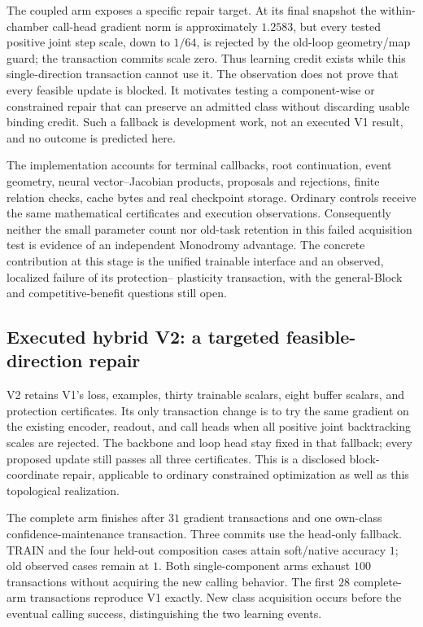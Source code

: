 The coupled arm exposes a specific repair target. At its final snapshot the
within-chamber call-head gradient norm is approximately $1.2583$, but every
tested positive joint step scale, down to $1/64$, is rejected by the old-loop
geometry/map guard; the transaction commits scale zero. Thus learning credit
exists while this single-direction transaction cannot use it. The observation
does not prove that every feasible update is blocked. It motivates testing a
component-wise or constrained repair that can preserve an admitted class
without discarding usable binding credit. Such a fallback is development
work, not an executed V1 result, and no outcome is predicted here.

The implementation accounts for terminal callbacks, root continuation,
event geometry, neural vector--Jacobian products, proposals and rejections,
finite relation checks, cache bytes and real checkpoint storage. Ordinary
controls receive the same mathematical certificates and execution
observations. Consequently neither the small parameter count nor old-task
retention in this failed acquisition test is evidence of an independent
Monodromy advantage. The concrete contribution at this stage is the unified
trainable interface and an observed, localized failure of its protection--
plasticity transaction, with the general-Block and competitive-benefit
questions still open.


\subsection{Executed hybrid V2: a targeted feasible-direction repair}

V2 retains V1's loss, examples, thirty trainable scalars, eight buffer scalars,
and protection certificates. Its only transaction change is to try the same
gradient on the existing encoder, readout, and call heads when all positive
joint backtracking scales are rejected. The backbone and loop head stay fixed
in that fallback; every proposed update still passes all three certificates.
This is a disclosed block-coordinate repair, applicable to ordinary constrained
optimization as well as this topological realization.

The complete arm finishes after $31$ gradient transactions and one own-class
confidence-maintenance transaction. Three commits use the head-only fallback.
TRAIN and the four held-out composition cases attain soft/native accuracy $1$;
old observed cases remain at $1$. Both single-component arms exhaust $100$
transactions without acquiring the new calling behavior. The first $28$
complete-arm transactions reproduce V1 exactly. New class acquisition occurs
before the eventual calling success, distinguishing the two learning events.

